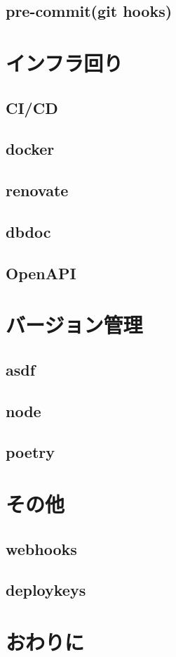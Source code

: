 \subsection{pre-commit(git hooks)}


\section{インフラ回り}

\subsection{CI/CD}
\subsection{docker}
\subsection{renovate}
\subsection{dbdoc}
\subsection{OpenAPI}

\section{バージョン管理}

\subsection{asdf}
\subsection{node}
\subsection{poetry}

\section{その他}
\subsection{webhooks}
\subsection{deploykeys}

\section{おわりに}